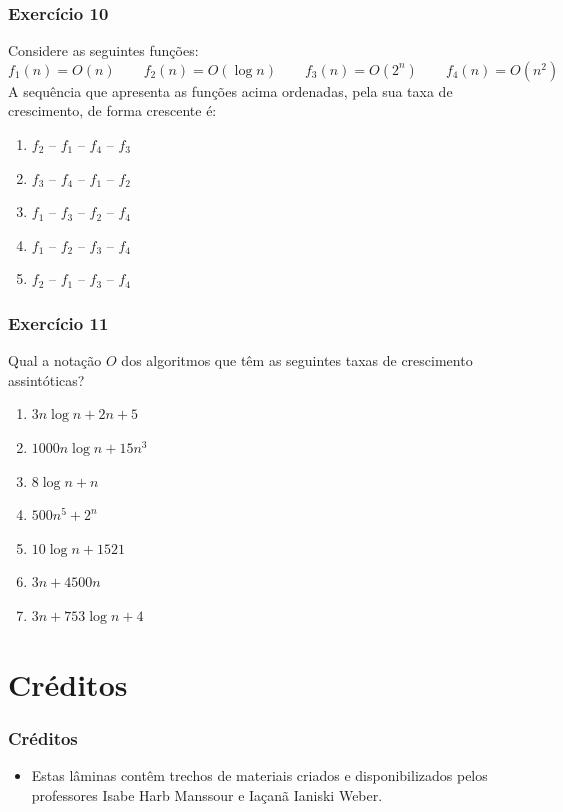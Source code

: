 \documentclass[aspectratio=169]{beamer}
\begin{document}
\begin{frame}[fragile]\frametitle{Exercício 10} %
Considere as seguintes funções:
\[ f_1(n) = O(n) \qquad f_2(n) = O(\log{n}) \qquad f_3(n) = O(2^n) \qquad f_4(n) = O(n^2) \]
A sequência que apresenta as funções acima ordenadas, pela sua taxa de crescimento, de forma crescente é:
\begin{enumerate}[A]
	\item $f_2$ -- $f_1$ -- $f_4$ -- $f_3$ %
	\item $f_3$ -- $f_4$ -- $f_1$ -- $f_2$
	\item $f_1$ -- $f_3$ -- $f_2$ -- $f_4$
	\item $f_1$ -- $f_2$ -- $f_3$ -- $f_4$
	\item $f_2$ -- $f_1$ -- $f_3$ -- $f_4$
\end{enumerate}
\end{frame}

\begin{frame}[fragile]\frametitle{Exercício 11} %
Qual a notação $O$ dos algoritmos que têm as seguintes taxas de crescimento assintóticas?
\begin{enumerate}[a]
	\item $3n\log{n} + 2n + 5$      %
	\item $1000n\log{n} + 15n^3$    %
	\item $8\log{n} + n$            %
	\item $500n^5 + 2^n$            %
	\item $10\log{n} + 1521$        %
	\item $3n + 4500n$              %
	\item $3n + 753\log{n} + 4$     %
\end{enumerate}
	\end{frame}

\section{Créditos}

\begin{frame}\frametitle{Créditos}
\begin{itemize}
	\item Estas lâminas contêm trechos de materiais criados e disponibilizados pelos professores Isabe Harb Manssour e Iaçanã Ianiski Weber.
\end{itemize}
\end{frame}
\end{document}
